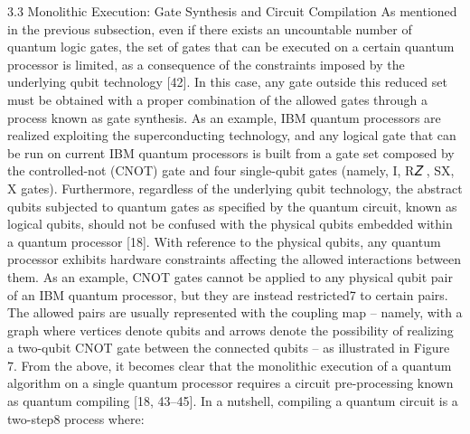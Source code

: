 3.3 Monolithic Execution: Gate Synthesis and Circuit Compilation As mentioned in the previous subsection, even if there exists an uncountable number of quantum logic gates, the set of gates that can be executed on a certain quantum processor is limited, as a consequence of the constraints imposed by the underlying qubit technology [42]. In this case, any gate outside this reduced set must be obtained with a proper combination of the allowed gates through a process known as gate synthesis. As an example, IBM quantum processors are realized exploiting the superconducting technology, and any logical gate that can be run on current IBM quantum processors is built from a gate set composed by the controlled-not (CNOT) gate and four single-qubit gates (namely, I, R𝑍 , SX, X gates). Furthermore, regardless of the underlying qubit technology, the abstract qubits subjected to quantum gates as specified by the quantum circuit, known as logical qubits, should not be confused with the physical qubits embedded within a quantum processor [18]. With reference to the physical qubits, any quantum processor exhibits hardware constraints affecting the allowed interactions between them. As an example, CNOT gates cannot be applied to any physical qubit pair of an IBM quantum processor, but they are instead restricted7 to certain pairs. The allowed pairs are usually represented with the coupling map – namely, with a graph where vertices denote qubits and arrows denote the possibility of realizing a two-qubit CNOT gate between the connected qubits – as illustrated in Figure 7. From the above, it becomes clear that the monolithic execution of a quantum algorithm on a single quantum processor requires a circuit pre-processing known as quantum compiling [18, 43–45]. In a nutshell, compiling a quantum circuit is a two-step8 process where:

